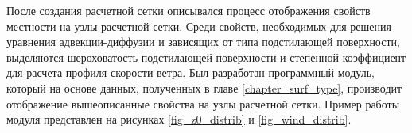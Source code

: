 После создания расчетной сетки описывался процесс отображения свойств местности на узлы расчетной сетки. Среди свойств, 
необходимых для решения уравнения адвекции-диффузии и зависящих от типа подстилающей поверхности, выделяются 
шероховатость подстилающей поверхности и степенной коэффициент для расчета профиля скорости ветра. Был разработан 
программный модуль, который на основе данных, полученных в главе \ref{chapter_surf_type}, производит отображение 
вышеописанные свойства на узлы расчетной сетки. Пример работы модуля представлен на рисунках \ref{fig_z0_distrib} и 
\ref{fig_wind_distrib}.